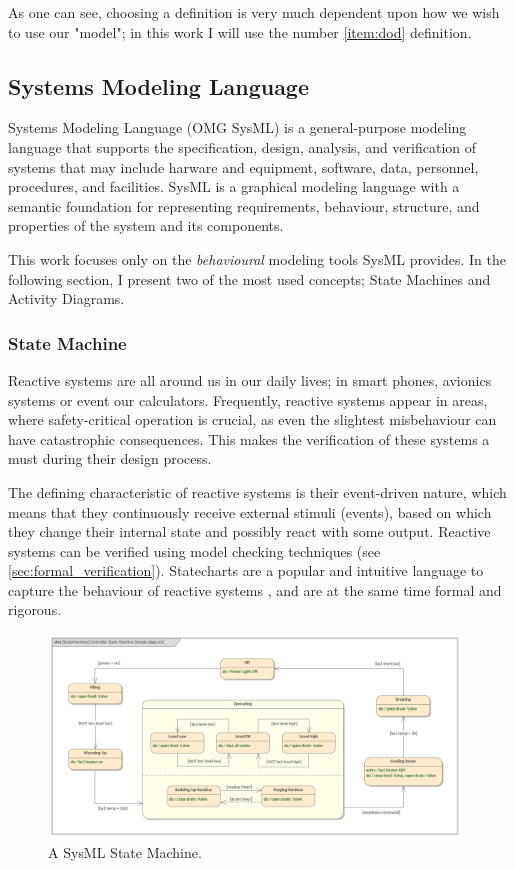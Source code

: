 As one can see, choosing a definition is very much dependent upon how we wish to use our "model"; in this work I will use the number \ref{item:dod} definition.

\subsection{Systems Modeling Language}\label{ssec:sysml}

Systems Modeling Language (OMG SysML)\cite{omg_sysml} is a general-purpose modeling language that supports the specification, design, analysis, and verification of systems that may include harware and equipment, software, data, personnel, procedures, and facilities. SysML is a graphical modeling language with a semantic foundation for representing requirements, behaviour, structure, and properties of the system and its components.\cite{sysml_practical_guide}

This work focuses only on the \emph{behavioural} modeling tools SysML provides. In the following section, I present two of the most used concepts; State Machines and Activity Diagrams.

\subsubsection{State Machine}

Reactive systems are all around us in our daily lives; in smart phones, avionics systems or event our calculators. Frequently, reactive systems appear in areas, where safety-critical operation is crucial, as even the slightest
misbehaviour can have catastrophic consequences. This makes the verification of these systems a must during their design process.

The defining characteristic of reactive systems is their event-driven nature, which means that they continuously receive external stimuli (events), based on which they change their internal state and possibly react with some output\cite{10.1007/978-3-642-82453-1_17}. Reactive systems can be verified using model checking techniques (see \autoref{sec:formal_verification}). Statecharts\cite{HAREL1987231} are a popular and intuitive language to capture the behaviour of reactive systems \cite{10.1145/3417990.3421407, 10.1007/978-3-319-11653-2_10}, and are at the same time formal and rigorous. 

\begin{figure}[!ht]
	\centering
	\includegraphics[width=110mm, keepaspectratio]{figures/sysml_state_machine.png}\hspace{1cm}
	\caption{A SysML State Machine.}
	\label{fig:sysml_state_machine}
\end{figure}

